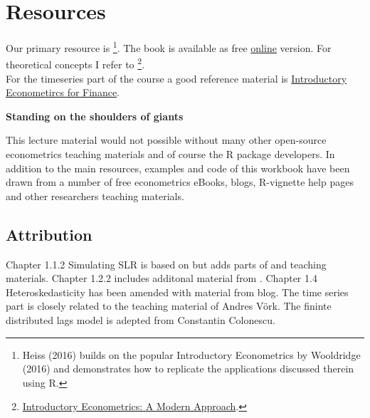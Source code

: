 \documentclass[]{book}
\let\rmarkdownfootnote\footnote%
\def\footnote{\protect\rmarkdownfootnote}
\begin{document}
\hypertarget{resources}{%
\section*{Resources}\label{resources}}

Our primary resource is \citet{heiss2016using} \footnote{Heiss (2016) builds on the popular Introductory Econometrics by Wooldridge (2016) and demonstrates how to replicate the applications discussed therein using R.}. The book is available as free \href{http://www.urfie.net/read.html}{online} version. For theoretical concepts I refer to \citet{wooldridge2015introductory}\footnote{\href{https://books.google.ee/books/about/Introductory_Econometrics_A_Modern_Appro.html?id=wUF4BwAAQBAJ\&source=kp_cover\&redir_esc=y}{Introductory Econometrics: A Modern Approach}.}.\\
For the timeseries part of the course a good reference material is \href{https://www.cambridge.org/pt/academic/subjects/economics/finance/introductory-econometrics-finance-3rd-edition?format=PB\&isbn=9781107661455}{Introductory Econometircs for Finance}.

\textbf{Standing on the shoulders of giants}

This lecture material would not possible without many other open-source econometrics teaching materials and of course the R package developers. In addition to the main resources, examples and code of this workbook have been drawn from a number of free econometrics eBooks, blogs, R-vignette help pages and other researchers teaching materials.

\hypertarget{attribution}{%
\subsection*{Attribution}\label{attribution}}

Chapter 1.1.2 Simulating SLR is based on \citet{heiss2016using} but adds parts of \citet{dalpiaz2016} and \citet{colonescu2018} teaching materials. Chapter 1.2.2 includes additonal material from \citet{Hanck2018}. Chapter 1.4 Heteroskedasticity has been amended with material from \citet{Rodrigues2018} blog. The time series part is closely related to the teaching material of Andres Vörk. The fininte distributed lags model is adepted from Constantin Colonescu.
\end{document}
